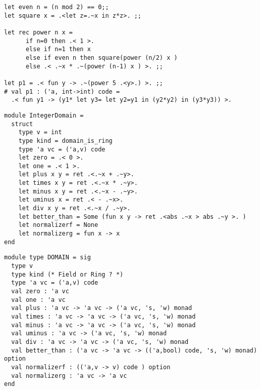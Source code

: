 \documentclass[landscape]{slides}
\begin{document}
\begin{slide}
\begin{verbatim}
let even n = (n mod 2) == 0;;
let square x = .<let z=.~x in z*z>. ;;

let rec power n x =
      if n=0 then .< 1 >.
      else if n=1 then x
      else if even n then square(power (n/2) x )
      else .< .~x * .~(power (n-1) x ) >. ;;

let p1 = .< fun y -> .~(power 5 .<y>.) >. ;;
# val p1 : ('a, int->int) code = 
  .< fun y1 -> (y1* let y3= let y2=y1 in (y2*y2) in (y3*y3)) >.
\end{verbatim}
\end{slide}

\begin{slide}
\begin{verbatim}
module IntegerDomain = 
  struct
    type v = int
    type kind = domain_is_ring
    type 'a vc = ('a,v) code
    let zero = .< 0 >.  
    let one = .< 1 >. 
    let plus x y = ret .<.~x + .~y>. 
    let times x y = ret .<.~x * .~y>.
    let minus x y = ret .<.~x - .~y>.
    let uminus x = ret .< - .~x>.
    let div x y = ret .<.~x / .~y>. 
    let better_than = Some (fun x y -> ret .<abs .~x > abs .~y >. )
    let normalizerf = None 
    let normalizerg = fun x -> x
end
\end{verbatim}
\end{slide}

\begin{slide}
\begin{verbatim}
module type DOMAIN = sig
  type v
  type kind (* Field or Ring ? *)
  type 'a vc = ('a,v) code
  val zero : 'a vc
  val one : 'a vc
  val plus : 'a vc -> 'a vc -> ('a vc, 's, 'w) monad
  val times : 'a vc -> 'a vc -> ('a vc, 's, 'w) monad
  val minus : 'a vc -> 'a vc -> ('a vc, 's, 'w) monad
  val uminus : 'a vc -> ('a vc, 's, 'w) monad
  val div : 'a vc -> 'a vc -> ('a vc, 's, 'w) monad
  val better_than : ('a vc -> 'a vc -> (('a,bool) code, 's, 'w) monad) option
  val normalizerf : (('a,v -> v) code ) option
  val normalizerg : 'a vc -> 'a vc
end 
\end{verbatim}
\end{slide}
\end{document}

